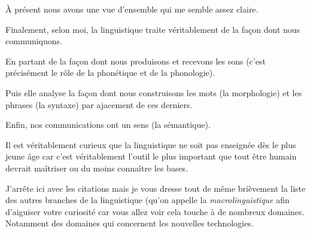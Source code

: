 \begin{center}
\begin{mdframed}[style=tradstyle, frametitle={\exFR{Traduction} d'un extrait du livre \bs}]
\end{mdframed}  
\end{center}


À présent nous avons une vue d'ensemble qui me semble assez
claire.

Finalement, selon moi, la linguistique traite véritablement de
la façon dont nous communiquons.

En partant de la façon dont nous produisons et recevons les sons
(c'est précisément le rôle de la phonétique et de la phonologie).

Puis elle analyse la façon dont nous construisons les mots (la
morphologie) et les phrases (la syntaxe) par ajacement de ces
derniers.

Enfin, nos communications ont un sens (la sémantique).

Il est véritablement curieux que la linguistique ne soit pas enseignée
dès le plus jeune âge car c'est véritablement l'outil le plus
important que tout être humain devrait maîtriser ou du moins connaître les bases.

J'arrête ici avec les citations mais je vous dresse tout de même
brièvement la liste des autres branches de la linguistique (qu'on
appelle la \emph{macrolinguistique} afin d'aiguiser votre curiosité
car vous allez voir cela touche à de nombreux domaines. Notamment des
domaines qui concernent les nouvelles technologies.

